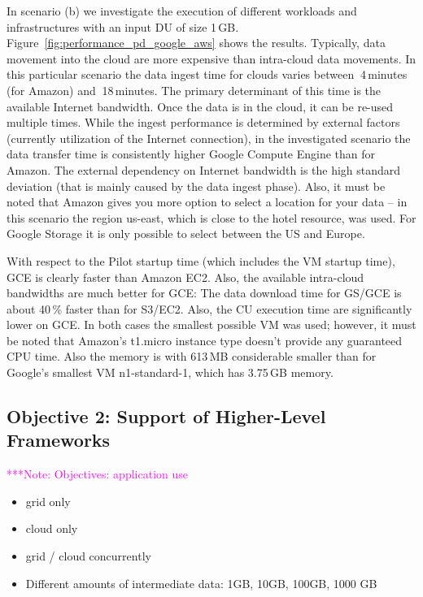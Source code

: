 \documentclass[times]{cpeauth}
\newcommand{\note}[1]{ {\textcolor{magenta} { ***Note: #1 }}}
\newcommand{\note}[1]{}
\newcommand{\pilot}{Pilot\xspace}
\newcommand{\du}{DU\xspace}
\newcommand{\cu}{CU\xspace}
\begin{document}
In scenario (b) we investigate the execution of different workloads and
infrastructures with an input \du of size 1\,GB.
Figure~\ref{fig:performance_pd_google_aws} shows the results. Typically, data
movement into the cloud are more expensive than intra-cloud data movements. In
this particular scenario the data ingest time for clouds varies between
$~$4\,minutes (for Amazon) and $~$18\,minutes. The primary determinant of this
time is the available Internet bandwidth. Once the data is in the cloud, it
can be re-used multiple times. While the ingest performance is determined by
external factors (currently utilization of the Internet connection), in the
investigated scenario the data transfer time is consistently higher Google
Compute Engine than for Amazon. The external dependency on Internet bandwidth
is the high standard deviation (that is mainly caused by the data ingest
phase). Also, it must be noted that Amazon gives you more option to select a
location for your data -- in this scenario the region us-east, which is close
to the hotel resource, was used. For Google Storage it is only possible to
select between the US and Europe.

With respect to the \pilot startup time (which includes the VM startup time), 
GCE is clearly faster than Amazon EC2. Also, the available intra-cloud 
bandwidths are much better for GCE: The data download time for GS/GCE is about 
40\,\% faster than for S3/EC2. Also, the \cu execution time are significantly 
lower on GCE. In both cases the smallest possible VM was used; however, it 
must be noted that Amazon's t1.micro instance type doesn't provide any 
guaranteed CPU time. Also the memory is with 613\,MB considerable smaller than 
for Google's smallest VM n1-standard-1, which has 3.75\,GB memory.




\subsection{Objective 2: Support of Higher-Level Frameworks}

\note{Objectives: application use}



\begin{itemize}
	\item grid only
	\item cloud only
	\item grid / cloud concurrently
	\item  Different amounts of intermediate data: 1GB, 10GB, 100GB, 1000 GB	
\end{itemize}
\end{document}
